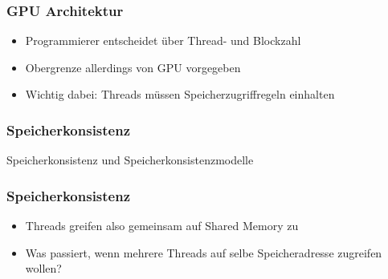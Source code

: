 \documentclass{sikslides}
\begin{document}
\begin{frame}
  \frametitle{GPU Architektur }
	\begin{itemize}
		\item Programmierer entscheidet über Thread- und Blockzahl
\bigskip
		\item Obergrenze allerdings von GPU vorgegeben
\bigskip
		\item Wichtig dabei: Threads müssen Speicherzugriffregeln einhalten
	\end{itemize}
\end{frame}




\begin{frame}
	\frametitle{Speicherkonsistenz}
Speicherkonsistenz und Speicherkonsistenzmodelle
\end{frame}

\begin{frame}
	\frametitle{Speicherkonsistenz}
	\begin{itemize}
		\item Threads greifen also gemeinsam auf Shared Memory zu
\bigskip
		\item Was passiert, wenn mehrere Threads auf selbe Speicheradresse zugreifen wollen?
	\end{itemize}
\end{frame}
\end{document}
